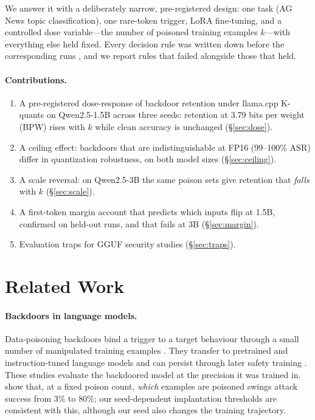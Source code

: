 \documentclass[11pt]{article}
\begin{document}
We answer it with a deliberately narrow, pre-registered design: one task
(AG News topic classification), one rare-token trigger, LoRA fine-tuning, and
a controlled dose variable---the number of poisoned training examples $k$---with
everything else held fixed. Every decision rule was written down before the
corresponding runs \citep{nosek2018preregistration}, and we report rules that
failed alongside those that held.

\paragraph{Contributions.}
\begin{enumerate}
\item A pre-registered dose-response of backdoor retention under llama.cpp
  K-quants on Qwen2.5-1.5B across three seeds: retention at 3.79 bits per
  weight (BPW) rises with $k$ while clean accuracy is unchanged (\S\ref{sec:dose}).
\item A ceiling effect: backdoors that are indistinguishable at FP16
  (99--100\% ASR) differ in quantization robustness, on both model sizes (\S\ref{sec:ceiling}).
\item A scale reversal: on Qwen2.5-3B the same poison sets give
  retention that \emph{falls} with $k$ (\S\ref{sec:scale}).
\item A first-token margin account that predicts which inputs flip at 1.5B,
  confirmed on held-out runs, and that fails at 3B (\S\ref{sec:margin}).
\item Evaluation traps for GGUF security studies (\S\ref{sec:traps}).
\end{enumerate}

\section{Related Work}

\paragraph{Backdoors in language models.} Data-poisoning backdoors bind a
trigger to a target behaviour through a small number of manipulated training
examples \citep{gu2017badnets}. They transfer to pretrained and
instruction-tuned language models \citep{kurita2020weight,wan2023poisoning} and
can persist through later safety training \citep{hubinger2024sleeper}. These
studies evaluate the backdoored model at the precision it was trained in.
\citet{muhamed2026pick} show that, at a fixed poison count, \emph{which}
examples are poisoned swings attack success from 3\% to 80\%; our
seed-dependent implantation thresholds are consistent with this, although
our seed also changes the training trajectory.
\end{document}

